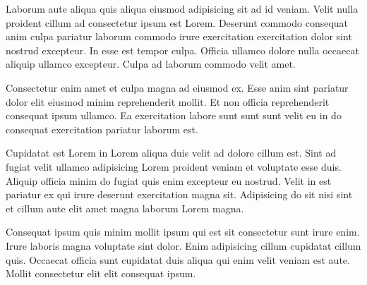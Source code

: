 Laborum aute aliqua quis aliqua eiusmod adipisicing sit ad id veniam. Velit nulla proident cillum ad consectetur ipsum est Lorem. Deserunt commodo consequat anim culpa pariatur laborum commodo irure exercitation exercitation dolor sint nostrud excepteur. In esse est tempor culpa. Officia ullamco dolore nulla occaecat aliquip ullamco excepteur. Culpa ad laborum commodo velit amet.

Consectetur enim amet et culpa magna ad eiusmod ex. Esse anim sint pariatur dolor elit eiusmod minim reprehenderit mollit. Et non officia reprehenderit consequat ipsum ullamco. Ea exercitation labore sunt sunt sunt velit eu in do consequat exercitation pariatur laborum est.

Cupidatat est Lorem in Lorem aliqua duis velit ad dolore cillum est. Sint ad fugiat velit ullamco adipisicing Lorem proident veniam et voluptate esse duis. Aliquip officia minim do fugiat quis enim excepteur eu nostrud. Velit in est pariatur ex qui irure deserunt exercitation magna sit. Adipisicing do sit nisi sint et cillum aute elit amet magna laborum Lorem magna.

Consequat ipsum quis minim mollit ipsum qui est sit consectetur sunt irure enim. Irure laboris magna voluptate sint dolor. Enim adipisicing cillum cupidatat cillum quis. Occaecat officia sunt cupidatat duis aliqua qui enim velit veniam est aute. Mollit consectetur elit elit consequat ipsum.
